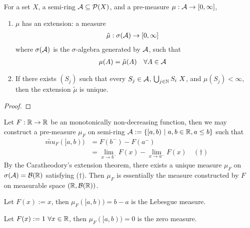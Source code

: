 \documentclass[11pt]{article}
\newcommand{\s}[0]{$\sigma$}
\begin{document}
	\begin{theorem}
	    For a set $X$, a semi-ring $\mathcal{{A}} \subseteq \mathcal{{P}}(X)$, and a pre-measure $\mu: \mathcal{{A}} \to [0, \infty]$,
	    \begin{enumerate}
	        \item $\mu$ has an extension: a measure \begin{align}
	            \tilde{\mu}: \sigma(\mathcal{{A}}) \to [0, \infty]
	        \end{align}
	        where $\sigma(\mathcal{{A}})$ is the \s-algebra generated by $\mathcal{{A}}$, such that
	        \begin{align}
	            \mu(A) = \tilde{\mu}(A)\quad \forall A \in \mathcal{{A}}
	        \end{align}
	        \item If there exists $(S_j)$ such that every $S_j \in \mathcal{{A}}$, $\bigcup_{j \in \mathbb{N}} S_i \ X$, and $\mu(S_j) < \infty$, then the extension $\tilde{\mu}$ is unique.
	    \end{enumerate}
	\end{theorem}
	
	\begin{proof}
	\end{proof}
	
	\begin{definition}
	    Let $F: \mathbb{R} \to \mathbb{R}$ be an monotonically non-decreasing function, then we may construct a pre-measure $\mu_F$ on semi-ring $\mathcal{{A}} := \{[a,b)\ |\ a, b \in \mathbb{R}, a \leq b\}$ such that
	    \begin{align}
	        \tilde{mu}_F([a, b)) &= F(b^-) - F(a^-) \\&= \lim_{x \to b^-} F(x) - \lim_{x \to a^-} F(x)\quad (\dagger)
	    \end{align}
	    By the Caratheodory's extension theorem, there exists a unique measure $\mu_F$ on $\sigma(\mathcal{{A}}) = \mathcal{{B}}(\mathbb{R})$ satisfying ($\dagger$).
	    Then $\mu_F$ is essentially the measure constructed by $F$ on measurable space $(\mathbb{R}, \mathcal{{B}}(\mathbb{R}))$.
	\end{definition}
	
	\begin{example}
	    Let $F(x) := x$, then $\mu_F([a, b)) = b - a$ is the Lebesgue measure.
	\end{example}
	
	\begin{example}
	    Let $F(x) := 1\ \forall x \in \mathbb{R}$, then $\mu_F([a, b)) = 0$ is the zero measure.
	\end{example}
	
\end{document}
